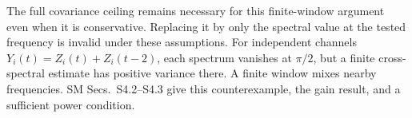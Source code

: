 The full covariance ceiling remains necessary for this finite-window argument even when it is conservative. Replacing it by only the spectral value at the tested frequency is invalid under these assumptions. For independent channels $Y_i(t)=Z_i(t)+Z_i(t-2)$, each spectrum vanishes at $\pi/2$, but a finite cross-spectral estimate has positive variance there. A finite window mixes nearby frequencies. SM Secs.~S4.2--S4.3 give this counterexample, the gain result, and a sufficient power condition.

